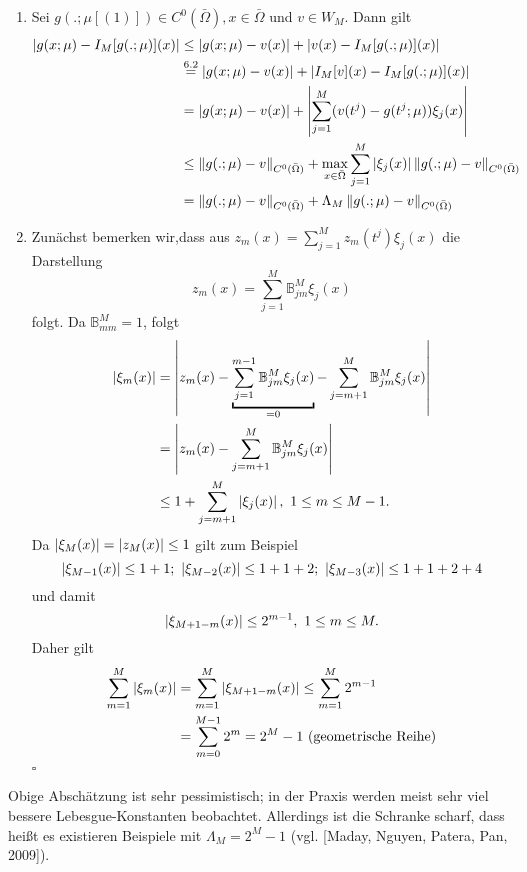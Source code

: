 \begin{enumerate}
	\item Sei $g(.;\mu[(1)])\in C^0(\bar{\Omega}),x\in \bar{\Omega}$ und $v\in W_M$.
	Dann gilt
	\begin{align*}
	\left\vert g(x;\mu) - I_M[g(.;\mu)](x)\right\vert &\le \left\vert g(x;\mu) - v(x)\right\vert + \left\vert v(x) - I_M[g(.;\mu)](x)\right\vert\\
	&\stackrel{6.2}{=} \left\vert g(x;\mu) - v(x)\right\vert + \left\vert I_M[v](x) - I_M[g(.;\mu)](x)\right\vert\\
	&= \left\vert g(x;\mu) - v(x)\right\vert + \left\vert\sum_{j=1}^M(v(t^j)-g(t^j;\mu)) \xi_j(x)\right\vert\\
	&\le \left\Vert g(.;\mu) - v\right\Vert_{C^0(\bar{\Omega})} + \max\limits_{x\in \bar{\Omega}} \sum_{j=1}^M \left\vert\xi_j(x)\right\vert \left\Vert g(.;\mu) - v\right\Vert_{C^0(\bar{\Omega})}\\
	&= \left\Vert g(.;\mu) - v\right\Vert_{C^0(\bar{\Omega})} + \Lambda_M \left\Vert g(.;\mu) - v\right\Vert_{C^0(\bar{\Omega})}
	\end{align*}
	\item Zunächst bemerken wir,dass aus $z_m(x) = \sum_{j=1}^M z_m(t^j)\xi_j(x)$ die Darstellung
	\[
	z_m(x) = \sum_{j=1}^M \mathbb{B}_{jm}^M \xi_j(x)
	\]
	folgt.
	Da $\mathbb{B}_{mm}^M=1$, folgt
	\begin{align*}
	\abs{\xi_m(x)} &= \abs{z_m(x) - \underbracket{\sum_{j=1}^{m-1} \mathbb{B}_{jm}^M\xi_j(x)}_{=0} - \sum_{j=m+1}^{M} \mathbb{B}_{jm}^M\xi_j(x)}\\
	&= \abs{z_m(x) - \sum_{j=m+1}^{M} \mathbb{B}_{jm}^M\xi_j(x)}\\
	&\le 1 + \sum_{j=m+1}^M \abs{\xi_j(x)},~ 1\le m\le M-1.
	\end{align*}
	Da $\left\vert\xi_M(x)\right\vert=\left\vert z_M(x)\right\vert\le 1$ gilt zum Beispiel
	\[
	\left\vert\xi_{M-1}(x)\right\vert \le 1+1;~ \left\vert\xi_{M-2}(x)\right\vert\le 1+1+2;~ \left\vert\xi_{M-3}(x)\right\vert\le 1+1+2+4
	\]
	und damit
	\[
	\left\vert\xi_{M+1-m}(x)\right\vert \le 2^{m-1},~ 1\le m\le M.
	\]
	Daher gilt
	\begin{align*}
	\sum_{m=1}^M \left\vert\xi_m(x)\right\vert &= \sum_{m=1}^M \left\vert\xi_{M+1-m}(x)\right\vert \le \sum_{m=1}^M 2^{m-1}\\
	&= \sum_{m=0}^{M-1} 2^m = 2^M-1 ~ \text{(geometrische Reihe)}
	\end{align*}
	\hfill $\square$
\end{enumerate}

Obige Abschätzung ist sehr pessimistisch; in der Praxis werden meist sehr viel bessere Lebesgue-Konstanten beobachtet.
Allerdings ist die Schranke scharf, dass heißt es existieren Beispiele mit $\Lambda_M=2^M-1$ (vgl. [Maday, Nguyen, Patera, Pan, 2009]).


